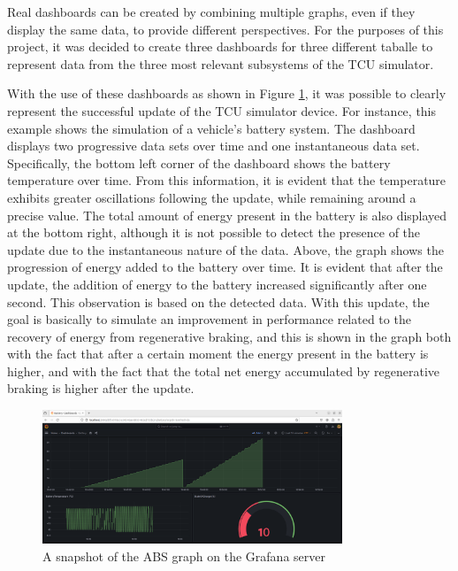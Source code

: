 Real dashboards can be created by combining multiple graphs, even if they display the same data, to provide different perspectives. For the purposes of this project, it was decided to create three dashboards for three different taballe to represent data from the three most relevant subsystems of the TCU simulator. 

With the use of these dashboards as shown in Figure \ref{fig:GrafanaABS}, it was possible to clearly represent the successful update of the TCU simulator device. For instance, this example shows the simulation of a vehicle's battery system. The dashboard displays two progressive data sets over time and one instantaneous data set. Specifically, the bottom left corner of the dashboard shows the battery temperature over time. From this information, it is evident that the temperature exhibits greater oscillations following the update, while remaining around a precise value. The total amount of energy present in the battery is also displayed at the bottom right, although it is not possible to detect the presence of the update due to the instantaneous nature of the data. Above, the graph shows the progression of energy added to the battery over time. It is evident that after the update, the addition of energy to the battery increased significantly after one second. This observation is based on the detected data. With this update, the goal is basically to simulate an improvement in performance related to the recovery of energy from regenerative braking, and this is shown in the graph both with the fact that after a certain moment the energy present in the battery is higher, and with the fact that the total net energy accumulated by regenerative braking is higher after the update.
\begin{figure}[h]  %
    \centering
    \includegraphics[width=0.8\textwidth]{images/grafana_Battery.png}  %
    \caption{A snapshot of the ABS graph on the Grafana server}
    \label{fig:GrafanaABS}
\end{figure}

